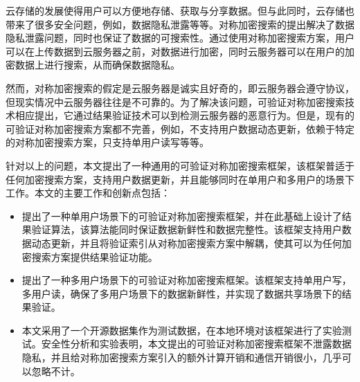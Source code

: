 \begin{cabstract}
  云存储的发展使得用户可以方便地存储、获取与分享数据。但与此同时，云存储也带来了很多安全问题，例如，数据隐私泄露等等。对称加密搜索的提出解决了数据隐私泄露问题，同时也保证了数据的可搜索性。通过使用对称加密搜索方案，用户可以在上传数据到云服务器之前，对数据进行加密，同时云服务器可以在用户的加密数据上进行搜索，从而确保数据隐私。

  然而，对称加密搜索的假定是云服务器是诚实且好奇的，即云服务器会遵守协议，但现实情况中云服务器往往是不可靠的。为了解决该问题，可验证对称加密搜索技术相应提出，它通过结果验证技术可以到检测云服务器的恶意行为。但是，现有的可验证对称加密搜索方案都不完善，例如，不支持用户数据动态更新，依赖于特定的对称加密搜索方案，只支持单用户读写等等。

  针对以上的问题，本文提出了一种通用的可验证对称加密搜索框架，该框架普适于任何加密搜索方案，支持用户数据更新，并且能够同时在单用户和多用户的场景下工作。本文的主要工作和创新点包括：

  \begin{itemize}
    \item 提出了一种单用户场景下的可验证对称加密搜索框架，并在此基础上设计了结果验证算法，该算法能同时保证数据新鲜性和数据完整性。该框架支持用户数据动态更新，并且将验证索引从对称加密搜索方案中解耦，使其可以为任何加密搜索方案提供结果验证功能。
    \item 提出了一种多用户场景下的可验证对称加密搜索框架。该框架支持单用户写，多用户读，确保了多用户场景下的数据新鲜性，并实现了数据共享场景下的结果验证。
    \item 本文采用了一个开源数据集作为测试数据，在本地环境对该框架进行了实验测试。安全性分析和实验表明，本文提出的可验证对称加密搜索框架不泄露数据隐私，并且给对称加密搜索方案引入的额外计算开销和通信开销很小，几乎可以忽略不计。
  \end{itemize}

\end{cabstract}


